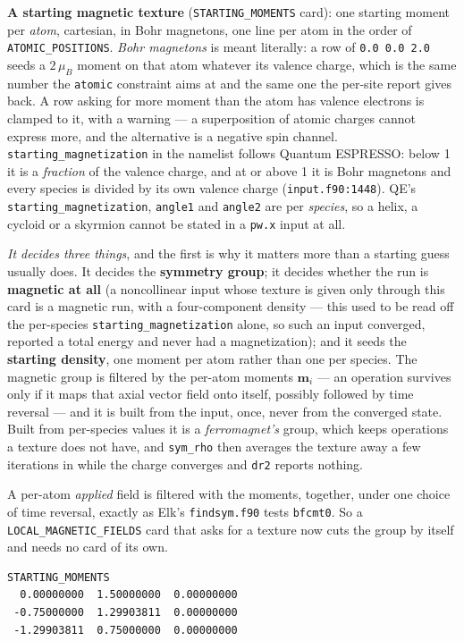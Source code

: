 \documentclass[11pt,a4paper]{article}
\newcommand{\qe}{Quantum ESPRESSO}
\newcommand{\code}[1]{\texttt{\small #1}}
\begin{document}
\textbf{A starting magnetic texture} (\code{STARTING\_MOMENTS} card): one
starting moment per \emph{atom}, cartesian, in Bohr magnetons, one line per atom
in the order of \code{ATOMIC\_POSITIONS}. \emph{Bohr magnetons} is meant
literally: a row of \code{0.0 0.0 2.0} seeds a $2\,\mu_B$ moment on that atom
whatever its valence charge, which is the same number the \code{atomic}
constraint aims at and the same one the per-site report gives back. A row asking
for more moment than the atom has valence electrons is clamped to it, with a
warning --- a superposition of atomic charges cannot express more, and the
alternative is a negative spin channel. \code{starting\_magnetization} in the
namelist follows \qe{}: below 1 it is a \emph{fraction} of the valence charge,
and at or above 1 it is Bohr magnetons and every species is divided by its own
valence charge (\code{input.f90:1448}). QE's \code{starting\_magnetization},
\code{angle1} and \code{angle2} are per \emph{species}, so a helix, a cycloid or
a skyrmion cannot be stated in a \code{pw.x} input at all.

\emph{It decides three things}, and the first is why it matters more than a
starting guess usually does. It decides the \textbf{symmetry group}; it decides
whether the run is \textbf{magnetic at all} (a noncollinear input whose texture
is given only through this card is a magnetic run, with a four-component density
--- this used to be read off the per-species \code{starting\_magnetization}
alone, so such an input converged, reported a total energy and never had a
magnetization); and it seeds the \textbf{starting density}, one moment per atom
rather than one per species. The magnetic group is filtered by the
per-atom moments $\mathbf{m}_i$ --- an operation survives only if it maps that
axial vector field onto itself, possibly followed by time reversal --- and it is
built from the input, once, never from the converged state. Built from
per-species values it is a \emph{ferromagnet's} group, which keeps operations a
texture does not have, and \code{sym\_rho} then averages the texture away a few
iterations in while the charge converges and \code{dr2} reports nothing.

A per-atom \emph{applied} field is filtered with the moments, together, under one
choice of time reversal, exactly as Elk's \code{findsym.f90} tests \code{bfcmt0}.
So a \code{LOCAL\_MAGNETIC\_FIELDS} card that asks for a texture now cuts the
group by itself and needs no card of its own.

\begin{lstlisting}
STARTING_MOMENTS
  0.00000000  1.50000000  0.00000000
 -0.75000000  1.29903811  0.00000000
 -1.29903811  0.75000000  0.00000000
\end{lstlisting}
\end{document}
